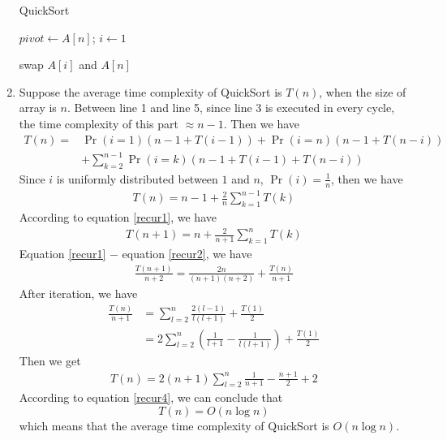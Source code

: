 \documentclass[12pt,a4paper,UTF8]{article}
\makeatletter
\newtheorem*{solution}{Solution}
\theoremstyle{definition}
\renewenvironment{solution}[1][Solution] {\par\pushQED{\qed}\normalfont\topsep6\p@\@plus6\p@\relax\trivlist\item[\hskip\labelsep\bfseries#1\@addpunct{.}]\ignorespaces}{\popQED\endtrivlist\@endpefalse} \makeatother
\makeatother
\begin{document}
\begin{enumerate}
\begin{minipage}[t]{0.8\textwidth}
\begin{algorithm}[H]
      \BlankLine
      \caption{QuickSort}\label{Alg_Quick}


      $pivot \leftarrow A[n]$; $i \leftarrow 1$\;

      swap $A[i]$ and $A[n]$\;
    \end{algorithm}
    \end{minipage}

    \begin{solution}
        Suppose the average time complexity of QuickSort is $T(n)$, when the size of array is $n$. Between line 1 and line 5, since line 3 is executed in every cycle, the time complexity of this part $\approx n - 1$. Then we have
        \begin{align*}
        T(n) = &\Pr(i = 1)(n-1 + T(i-1)) + \Pr(i = n)(n-1 + T(n - i))\\ &+ \sum_{k = 2}^{n-1} \Pr(i=k)(n-1+T(i-1)+T(n - i))
        \end{align*}
        Since $i$ is uniformly distributed between $1$ and $n$, $\Pr(i) = \frac{1}{n} $, then we have
        \begin{align}\label{recur1}
        T(n) = n-1 + \frac{2}{n} \sum_{k=1}^{n-1}T(k)
        \end{align}
        According to equation \ref{recur1}, we have
        \begin{align}\label{recur2}
        T(n+1) = n + \frac{2}{n+1} \sum_{k=1}^{n}T(k)
        \end{align}
        Equation \ref{recur1} $-$ equation \ref{recur2}, we have
        \begin{align}\label{recur3}
        \frac{T(n+1)}{n+2} = \frac{2n}{(n+1)(n+2)} + \frac{T(n)}{n+1}
        \end{align}
        After iteration, we have
        \begin{align*}
        \frac{T(n)}{n+1} &= \sum_{l=2}^{n}\frac{2(l-1)}{l(l+1)} + \frac{T(1)}{2}\\
        &= 2\sum_{l=2}^{n}(\frac{1}{l+1} - \frac{1}{l(l+1)}) + \frac{T(1)}{2}
        \end{align*}
        Then we get
        \begin{align}\label{recur4}
        T(n) = 2(n+1)\sum_{l=2}^{n}\frac{1}{n+1} - \frac{n+1}{2} + 2
        \end{align}
        According to equation \ref{recur4}, we can conclude that 
        $$ T(n) = O(n\log n)$$
        which means that the average time complexity of QuickSort is $ O(n\log n) $.
    \end{solution}


\end{enumerate}
\end{document}
